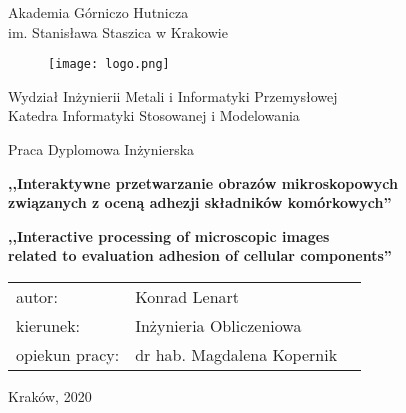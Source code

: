 \begin{titlepage}
    \begin{center}

        \vspace*{1cm}
        
        {
            \LARGE
            Akademia Górniczo Hutnicza\\
            \vspace{0.2cm}
            im. Stanisława Staszica w Krakowie
        }

        \vspace{0.5cm}

        \begin{figure}[h]
            \centering
            \texttt{[image: logo.png]}
        \end{figure}

        \vspace{0.5cm}

        {
            \LARGE
            Wydział Inżynierii Metali i Informatyki Przemysłowej\\
            \vspace{0.2cm}
            Katedra Informatyki Stosowanej i Modelowania
        }

        \vspace{0.5cm}

        {
            \LARGE
            Praca Dyplomowa Inżynierska
        }

        \vspace{0.5cm}

        {
            \Large
            \textbf{,,Interaktywne przetwarzanie obrazów mikroskopowych\\
            związanych z oceną adhezji składników komórkowych''}
        }

        \vspace{0.5cm}

        {
            \Large
            \textbf{,,Interactive processing of microscopic images\\
            related to evaluation adhesion of cellular components''}
        }

        \vfill

        \begin{flushleft}
        {
            \Large
            \begin{tabular}{ l l c }
                autor: & Konrad Lenart\\
                kierunek: & Inżynieria Obliczeniowa\\
                opiekun pracy: & dr hab. Magdalena Kopernik
            \end{tabular}
        }
        \end{flushleft}

        \vspace{0.5cm}

        {
            \Large
            Kraków, 2020
        }

        \vspace{1cm}

    \end{center}
\end{titlepage}